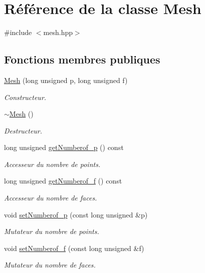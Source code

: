 \hypertarget{class_mesh}{\section{Référence de la classe Mesh}
\label{class_mesh}
}


{\ttfamily \#include $<$mesh.\-hpp$>$}

\subsection*{Fonctions membres publiques}
\begin{DoxyCompactItemize}
\item 
\hyperlink{class_mesh_af80c0ce0e47b3686348519345cd6f81c}{Mesh} (long unsigned p, long unsigned f)
\begin{DoxyCompactList}\small\item\em Constructeur. \end{DoxyCompactList}\item 
\hyperlink{class_mesh_a5efe4da1a4c0971cfb037bd70304c303}{$\sim$\-Mesh} ()
\begin{DoxyCompactList}\small\item\em Destructeur. \end{DoxyCompactList}\item 
long unsigned \hyperlink{class_mesh_a60382f3b0a69d639003c5ea28c352459}{get\-Numberof\-\_\-p} () const 
\begin{DoxyCompactList}\small\item\em Accesseur du nombre de points. \end{DoxyCompactList}\item 
long unsigned \hyperlink{class_mesh_a6d39761b9be2bf04be1b242da25a8dce}{get\-Numberof\-\_\-f} () const 
\begin{DoxyCompactList}\small\item\em Accesseur du nombre de faces. \end{DoxyCompactList}\item 
void \hyperlink{class_mesh_a04995a209c370f68ec8fd87378030d5f}{set\-Numberof\-\_\-p} (const long unsigned \&p)
\begin{DoxyCompactList}\small\item\em Mutateur du nombre de points. \end{DoxyCompactList}\item 
void \hyperlink{class_mesh_a1369e0b173511258592fcb60cd15982b}{set\-Numberof\-\_\-f} (const long unsigned \&f)
\begin{DoxyCompactList}\small\item\em Mutateur du nombre de faces. \end{DoxyCompactList}\end{DoxyCompactItemize}
